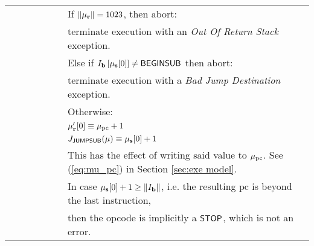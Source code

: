 \begin{tabu}{r l c c c c l}
&&&&&&  If $\lVert \mathbf{\mu}_\mathbf{r} \rVert = 1023$, then abort: \\
&&&&&&  terminate execution with an \emph{Out Of Return Stack} exception.\\
&&&&&&  Else if $I_{\mathbf{b}}\left[\mathbf{\mu}_{\mathbf{s}}[0]\right] \ne \mathsf{BEGINSUB}$ then abort: \\
&&&&&&  terminate execution with a \emph{Bad Jump Destination} exception.\\
&&&&&&  Otherwise:\\
&&&&&&  $\mathbf{\mu}'_{\mathbf{r}}[0] \equiv \mathbf{\mu}_{\mathrm{pc}}+1$ \\
&&&&&&  $J_{\mathsf{JUMPSUB}}(\mathbf{\mu}) \equiv \mathbf{\mu}_{\mathbf{s}}[0]+1 $  \\
&&&&&&   This has the effect of writing said value to $\mathbf{\mu}_{\mathrm{pc}}$. See (\ref{eq:mu_pc}) in Section \ref{sec:exe model}.\\
&&&&&&  In case $\mathbf{\mu}_{\mathbf{s}}[0]+1 \ge \lVert I_{\mathbf{b}} \rVert$, i.e. the resulting $\mathrm{pc}$ is beyond the last instruction,  \\
&&&&&&  then the opcode is implicitly a $\mathsf{STOP}$, which is not an error.\\
\bottomrule
\end{tabu}


